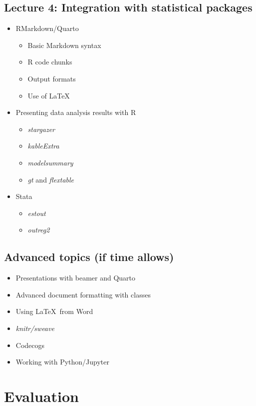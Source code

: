 \documentclass[a4paper,11pt]{article}
\begin{document}
\subsection{Lecture 4: Integration with statistical packages}

\begin{itemize}
    \item RMarkdown/Quarto
    \begin{itemize}
        \item Basic Markdown syntax
        \item R code chunks
        \item Output formats
        \item Use of \LaTeX
    \end{itemize}
    \item Presenting data analysis results with R
    \begin{itemize}
        \item \textit{stargazer}
        \item \textit{kableExtra}
        \item \textit{modelsummary}
        \item \textit{gt} and \textit{flextable}
    \end{itemize}
    \item Stata
    \begin{itemize}
        \item \textit{estout}
        \item \textit{outreg2}
    \end{itemize}
\end{itemize}

\subsection{Advanced topics (if time allows)}

\begin{itemize}
    \item Presentations with beamer and Quarto
    \item Advanced document formatting with classes
    \item Using \LaTeX \ from Word
    \item \textit{knitr/sweave}
    \item Codecogs
    \item Working with Python/Jupyter
\end{itemize}

\section{Evaluation}
\end{document}
